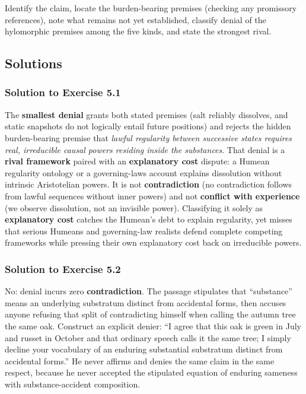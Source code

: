 Identify the claim, locate the burden-bearing premises (checking any promissory references), note what remains not yet established, classify denial of the hylomorphic premises among the five kinds, and state the strongest rival.

\subsection{Solutions}

\subsubsection*{Solution to Exercise 5.1}
The \textbf{smallest denial} grants both stated premises (salt reliably dissolves, and static snapshots do not logically entail future positions) and rejects the hidden burden-bearing premise that \emph{lawful regularity between successive states requires real, irreducible causal powers residing inside the substances}. That denial is a \textbf{rival framework} paired with an \textbf{explanatory cost} dispute: a Humean regularity ontology or a governing-laws account explains dissolution without intrinsic Aristotelian powers. It is not \textbf{contradiction} (no contradiction follows from lawful sequences without inner powers) and not \textbf{conflict with experience} (we observe dissolution, not an invisible power). Classifying it solely as \textbf{explanatory cost} catches the Humean's debt to explain regularity, yet misses that serious Humeans and governing-law realists defend complete competing frameworks while pressing their own explanatory cost back on irreducible powers.

\subsubsection*{Solution to Exercise 5.2}
No: denial incurs zero \textbf{contradiction}. The passage stipulates that ``substance'' means an underlying substratum distinct from accidental forms, then accuses anyone refusing that split of contradicting himself when calling the autumn tree the same oak. Construct an explicit denier: ``I agree that this oak is green in July and russet in October and that ordinary speech calls it the same tree; I simply decline your vocabulary of an enduring substantial substratum distinct from accidental forms.'' He never affirms and denies the same claim in the same respect, because he never accepted the stipulated equation of enduring sameness with substance-accident composition.

